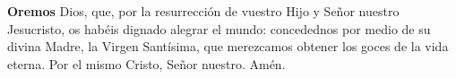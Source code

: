 \textbf{Oremos}
Dios, que, por la resurrección de vuestro Hijo y Señor nuestro Jesucristo,
os habéis dignado alegrar el mundo: concedednos por medio de su divina Madre, la Virgen Santísima,
que merezcamos obtener los goces de la vida eterna. Por el mismo Cristo, Señor nuestro. Amén.